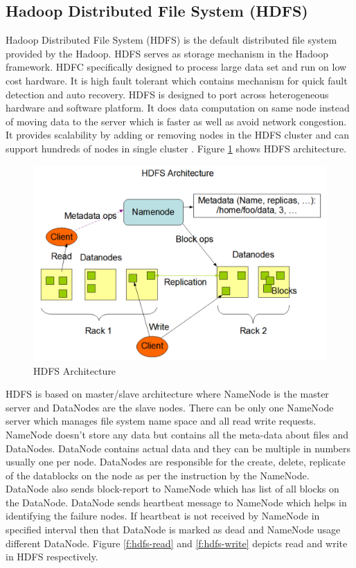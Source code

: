 \documentclass[sigconf]{acmart}
\begin{document}
\subsection{Hadoop Distributed File System (HDFS)}
Hadoop Distributed File System (HDFS) is the default distributed file system provided by the Hadoop. HDFS serves as storage mechanism in the Hadoop framework. HDFC specifically designed to process large data set and run on low cost hardware. It is high fault tolerant which contains mechanism for quick fault detection and auto recovery. HDFS is designed to port across heterogeneous hardware and software platform. It does data computation on same node instead of moving data to the server which is faster as well as avoid network congestion. It provides scalability by adding or removing nodes in the HDFS cluster and can support hundreds of nodes in single cluster \cite{www-hdfs-arch}. Figure \ref{f:hdfs-arch} shows HDFS architecture.
\begin{figure}[!ht]
  \centering\includegraphics[width=\columnwidth]{images/hdfsArch.PNG}
  \caption{HDFS Architecture \cite{www-hdfs-arch}}\label{f:hdfs-arch}
\end{figure}

HDFS is based on master/slave architecture where NameNode is the master server and DataNodes are the slave nodes. There can be only one NameNode server which manages file system name space and all read write requests. NameNode doesn't store any data but contains all the meta-data about files and DataNodes. DataNode contains actual data and they can be multiple in numbers usually one per node. DataNodes are responsible for the create, delete, replicate of the datablocks on the node as per the instruction by the NameNode. DataNode also sends block-report to NameNode which has list of all blocks on the DataNode. DataNode sends heartbeat message to NameNode which helps in identifying the failure nodes. If heartbeat is not received by NameNode in specified interval then that DataNode is marked as dead and NameNode usage different DataNode. Figure \ref{f:hdfs-read} and \ref{f:hdfs-write} depicts read and write in HDFS respectively.
\end{document}
